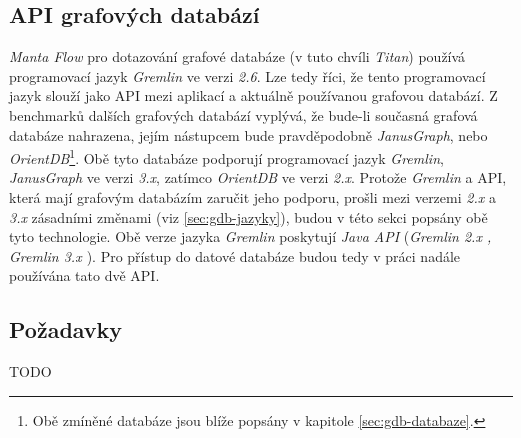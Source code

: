

\subsection{API grafových databází}
\label{sec:ana_gdbapi}
\textit{Manta Flow} pro dotazování grafové databáze (v tuto chvíli \textit{Titan}) používá programovací jazyk \textit{Gremlin} ve verzi \textit{2.6}. Lze tedy říci, že tento programovací jazyk slouží jako API mezi aplikací a aktuálně používanou grafovou databází. Z benchmarků dalších grafových databází \cite{Kovar18} vyplývá, že bude-li současná grafová databáze nahrazena, jejím nástupcem bude pravděpodobně \textit{JanusGraph}, nebo \textit{OrientDB}\footnote{Obě zmíněné databáze jsou blíže popsány v kapitole \ref{sec:gdb-databaze}.}. Obě tyto databáze podporují programovací jazyk \textit{Gremlin}, \textit{JanusGraph} ve verzi \textit{3.x}, zatímco \textit{OrientDB} ve verzi \textit{2.x}. Protože \textit{Gremlin} a API, která mají grafovým databázím zaručit jeho podporu, prošli mezi verzemi \textit{2.x} a \textit{3.x} zásadními změnami (viz \ref{sec:gdb-jazyky}), budou v této sekci popsány obě tyto technologie. Obě verze jazyka \textit{Gremlin} poskytují \textit{Java API} (\textit{Gremlin 2.x \cite{Gremlin14}, Gremlin 3.x \cite{Gremlin17}}). Pro přístup do datové databáze budou tedy v práci nadále používána tato dvě API.

\subsection{Požadavky}
TODO






